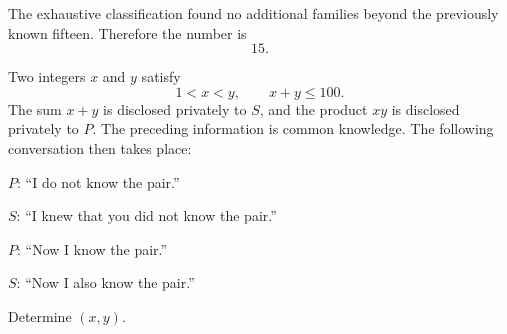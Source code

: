     \begin{solution}
        The exhaustive classification found no additional families beyond the
        previously known fifteen. Therefore the number is
        \[
            \boxed{15}.
        \]
    \end{solution}


    \begin{expectedproblem}
        Two integers $x$ and $y$ satisfy
        \[
            1<x<y,
            \qquad
            x+y\leq100.
        \]
        The sum $x+y$ is disclosed privately to $S$, and the product $xy$ is
        disclosed privately to $P$. The preceding information is common
        knowledge. The following conversation then takes place:
        \begin{problemchoices}
            \item $P$: ``I do not know the pair.''
            \item $S$: ``I knew that you did not know the pair.''
            \item $P$: ``Now I know the pair.''
            \item $S$: ``Now I also know the pair.''
        \end{problemchoices}
        Determine $(x,y)$.
    \end{expectedproblem}


